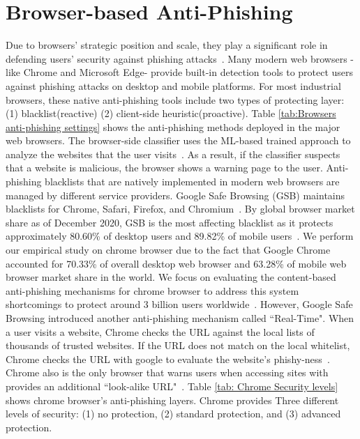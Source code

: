 
\section{Browser-based Anti-Phishing}
\label{s:browser-based}
Due to browsers' strategic position and scale, they play a significant role in defending users' security against phishing attacks~\cite{ma2009beyond}. Many modern web browsers -like Chrome and Microsoft Edge- provide built-in detection tools to protect users against phishing attacks on desktop and mobile platforms. For most industrial browsers, these native anti-phishing tools include two types of protecting layer: (1) blacklist(reactive) (2) client-side heuristic(proactive).
Table \ref{tab:Browsers anti-phishing settings} shows the anti-phishing methods deployed in the major web browsers.
The browser-side classifier uses the ML-based trained approach to analyze the websites that the user visits~\cite{liang2016cracking}. As a result, if the classifier suspects that a website is malicious, the browser shows a warning page to the user.
Anti-phishing blacklists that are natively implemented in modern web browsers are managed by different service providers. Google Safe Browsing (GSB) maintains blacklists for Chrome, Safari, Firefox, and Chromium~\cite{safebrowsing}.
By global browser market share as of December 2020, GSB is the most affecting blacklist as it protects approximately 80.60\%  of desktop users and 89.82\%  of mobile users~\cite{statcounterall,browsermarketshare}. We perform our empirical study on chrome browser due to the fact that Google Chrome accounted for 70.33\%  of overall desktop web browser and 63.28\%  of mobile web browser market share in the world. We focus on evaluating the content-based anti-phishing mechanisms for chrome browser to address this system shortcomings to protect around 3 billion users worldwide~\cite{statcounterdesktop,statcountermobile}.
However, Google Safe Browsing introduced another anti-phishing mechanism called ``Real-Time". When a user visits a website, Chrome checks the URL against the local lists of thousands of trusted websites. If the URL does not match on the local whitelist, Chrome checks the URL with google to evaluate the website's phishy-ness~\cite{googlechromeprivacywhitepaper}. Chrome also is the only browser that warns users when accessing sites with provides an additional ``look-alike URL"~\cite{cimpanu_2019}.
Table \ref{tab: Chrome Security levels} shows chrome browser's anti-phishing layers.
Chrome provides Three different levels of security: (1) no protection, (2) standard protection, and (3) advanced protection.

